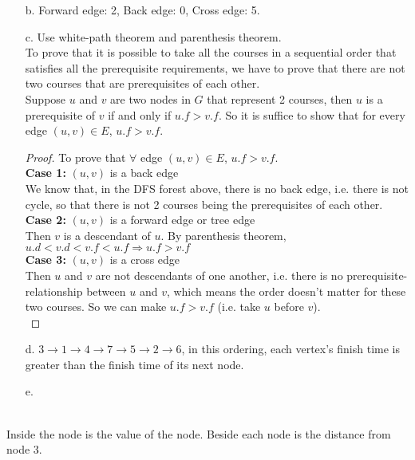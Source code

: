 \documentclass[10pt]{article}
\begin{document}
\begin{itemize}
\item[b.] Forward edge: 2, Back edge: 0, Cross edge: 5.
\item[c.] Use white-path theorem and parenthesis theorem.\\
To prove that it is possible to take all the courses
in a sequential order that satisfies all the prerequisite requirements, we have to prove that there are not two courses that are prerequisites of each other. \\
Suppose $u$ and $v$ are two nodes in $G$ that represent 2 courses, then $u$ is a prerequisite of $v$ if and only if $u.f>v.f$. So it is suffice to show that for every edge $(u,v)\in E$, $u.f>v.f$.
\begin{proof} To prove that $\forall$ edge $(u,v)\in E$, $u.f>v.f$.\\
\textbf{Case 1:} $(u, v)$ is a back edge\\
We know that, in the DFS forest above, there is no back edge, i.e. there is not cycle, so that there is not 2 courses being the prerequisites of each other.\\
\textbf{Case 2:} $(u,v)$ is a forward edge or tree edge\\
Then $v$ is a descendant of $u$. By parenthesis theorem, $u.d<v.d<v.f<u.f\Rightarrow u.f>v.f$\\
\textbf{Case 3:} $(u,v)$ is a cross edge\\
Then $u$ and $v$ are not descendants of one another, i.e. there is no prerequisite-relationship between $u$ and $v$, which means the order doesn't matter for these two courses. So we can make $u.f>v.f$ (i.e. take $u$ before $v$).\\
\end{proof}
\item[d.] $3\rightarrow 1\rightarrow 4\rightarrow 7\rightarrow 5\rightarrow 2\rightarrow 6$, in this ordering, each vertex's finish time is greater than the finish time of its next node.
\item[e.]
\end{itemize}
\\
Inside the node is the value of the node. Beside each node is the distance from node 3.
\end{document}
